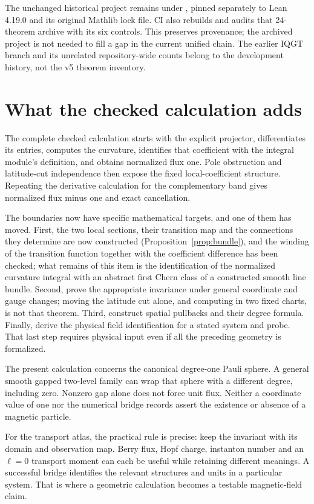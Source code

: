 \documentclass[11pt]{article}
\theoremstyle{definition}\newtheorem{definition}[theorem]{Definition}
\theoremstyle{remark}\newtheorem{remark}[theorem]{Remark}
\newcommand{\leanname}[1]{\texttt{\small\detokenize{#1}}}
\begin{document}
The unchanged historical project remains under \leanname{monopole_stance/}, pinned separately to Lean 4.19.0 and its original Mathlib lock file. CI also rebuilds and audits that 24-theorem archive with its six controls. This preserves provenance; the archived project is not needed to fill a gap in the current unified chain. The earlier IQGT branch and its unrelated repository-wide counts belong to the development history, not the v5 theorem inventory.

\section{What the checked calculation adds}
The complete checked calculation starts with the explicit projector, differentiates its entries, computes the curvature, identifies that coefficient with the integral module's definition, and obtains normalized flux one. Pole obstruction and latitude-cut independence then expose the fixed local-coefficient structure. Repeating the derivative calculation for the complementary band gives normalized flux minus one and exact cancellation.

The boundaries now have specific mathematical targets, and one of them has moved. First, the two local sections, their transition map and the connections they determine are now constructed (Proposition~\ref{prop:bundle}), and the winding of the transition function together with the coefficient difference has been checked; what remains of this item is the identification of the normalized curvature integral with an abstract first Chern class of a constructed smooth line bundle. Second, prove the appropriate invariance under general coordinate and gauge changes; moving the latitude cut alone, and computing in two fixed charts, is not that theorem. Third, construct spatial pullbacks and their degree formula. Finally, derive the physical field identification for a stated system and probe. That last step requires physical input even if all the preceding geometry is formalized.

The present calculation concerns the canonical degree-one Pauli sphere. A general smooth gapped two-level family can wrap that sphere with a different degree, including zero. Nonzero gap alone does not force unit flux. Neither a coordinate value of one nor the numerical bridge records assert the existence or absence of a magnetic particle.

For the transport atlas, the practical rule is precise: keep the invariant with its domain and observation map. Berry flux, Hopf charge, instanton number and an $\ell=0$ transport moment can each be useful while retaining different meanings. A successful bridge identifies the relevant structures and units in a particular system. That is where a geometric calculation becomes a testable magnetic-field claim.
\end{document}
